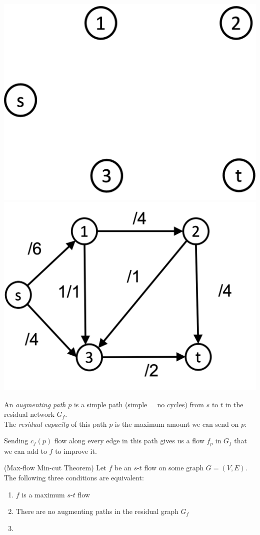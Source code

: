 \documentclass[11  pt]{article}
\begin{document}
	\includegraphics[width = .45\linewidth]{flow4empty.png} \hspace{2cm} \includegraphics[width = .5\linewidth]{flow5noflow.png} 
	
	\newpage
	An \emph{augmenting path} $p$ is a simple path (simple = no cycles) from $s$ to $t$ in the residual network $G_f$.\\
	
	The \emph{residual capacity} of this path $p$ is the maximum amount we can send on $p$:
	
	\vspace{2cm}
	
	Sending $c_f(p)$ flow along every edge in this path gives us a flow $f_p$ in $G_f$ that we can add to $f$ to improve it. \\
	
	
	\begin{theorem}
		(Max-flow Min-cut Theorem)
		Let $f$ be an $s$-$t$ flow on some graph $G = (V,E)$. The following three conditions are equivalent:
		\begin{enumerate}
			\item $f$ is a maximum $s$-$t$ flow
			\item There are no augmenting paths in the residual graph $G_f$
			\item %
		\end{enumerate}
	\end{theorem}
	
	\newpage
	\phantom{continued}
	
\end{document}
